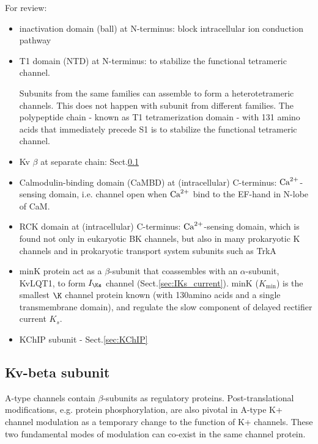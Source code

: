 For review: \citep{sansom2002}

\begin{itemize}
  
  \item inactivation domain (ball) at N-terminus: block intracellular ion
  conduction pathway
  
  \item T1 domain (NTD) at N-terminus: to stabilize the functional
  tetrameric channel.

Subunits from the same families can assemble to form a heterotetrameric
channels. This does not happen with subunit from different families. The
polypeptide chain - known as T1 tetramerization domain - with 131 amino acids
that immediately precede S1 is to stabilize the functional tetrameric channel.
  
  \item Kv $\beta$ at separate chain: Sect.\ref{sec:beta-subunit-K+-channels}
  
  \item Calmodulin-binding domain (CaMBD) at (intracellular) C-terminus:
  ${\text{Ca}^{2+}}$-sensing domain, i.e. channel open when ${\text{Ca}^{2+}}$ bind to the EF-hand in
  N-lobe of CaM.
  
  \item RCK domain at (intracellular) C-terminus: ${\text{Ca}^{2+}}$-sensing domain, which 
   is found not only in eukaryotic BK channels, but also in
  many prokaryotic K channels and in prokaryotic transport
  system subunits such as TrkA
  
  \item \label{sec:minK-subunit} minK protein act as a $\beta$-subunit that
  coassembles with an $\alpha$-subunit, KvLQT1, to form $I_\Ks$ channel
  (Sect.\ref{sec:IKs_current}). minK ($K_\min$) is the smallest $\K$ channel
  protein known (with 130amino acids and a single transmembrane domain), and
  regulate the slow component of delayed rectifier current $K_s$.
 
 \item  KChIP subunit - Sect.\ref{sec:KChIP}
\end{itemize}

\subsection{Kv-beta subunit}
\label{sec:beta-subunit-K+-channels}

A-type channels contain $\beta$-subunits as regulatory proteins.
Post-translational modifications, e.g. protein phosphorylation, are also pivotal
in A-type K+ channel modulation as a temporary change to the function of K+
channels. These two fundamental modes of modulation can co-exist in the same
channel protein.

